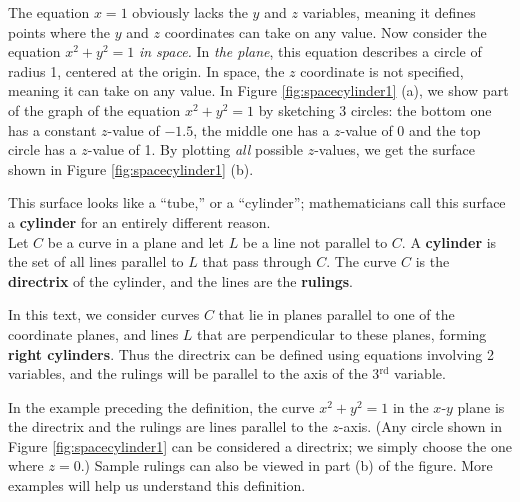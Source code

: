 The equation $x=1$ obviously lacks the $y$ and $z$ variables, meaning it defines points where the $y$ and $z$ coordinates can take on any value. Now consider the equation $x^2+y^2=1$ \emph{in space.} In \emph{the plane}, this equation describes a circle of radius 1, centered at the origin. In space, the $z$ coordinate is not specified, meaning it can take on any value. In Figure \ref{fig:spacecylinder1} (a), we show part of the graph of the equation $x^2+y^2=1$ by sketching 3 circles: the bottom one has a constant $z$-value of $-1.5$, the middle one has a $z$-value of 0 and the top circle has a $z$-value of 1. By plotting \emph{all} possible $z$-values, we get the  surface shown in Figure \ref{fig:spacecylinder1} (b).

This surface looks like a ``tube,'' or a ``cylinder''; mathematicians call this surface a \textbf{cylinder} for an entirely different reason.\\

{Let $C$ be a curve in a plane and let $L$ be a line not parallel to $C$. A \textbf{cylinder} is the set of all lines parallel to $L$ that pass through $C$. The curve $C$ is the \textbf{directrix} of the cylinder, and the lines are the \textbf{rulings}.
}

In this text, we consider curves $C$ that lie in planes parallel to one of the coordinate planes, and lines $L$ that are perpendicular to these planes, forming \textbf{right cylinders}. Thus the directrix can be defined using equations involving 2 variables, and the rulings will be parallel to the axis of the 3$^\text{rd}$ variable.

In the example preceding the definition, the curve $x^2+y^2=1$ in the $x$-$y$ plane is the directrix and the rulings are lines parallel to the $z$-axis. (Any circle shown in Figure \ref{fig:spacecylinder1} can be considered a directrix; we simply choose the one where $z=0$.) Sample rulings can also be viewed in part (b) of the figure. More examples will help us understand this definition.\\

